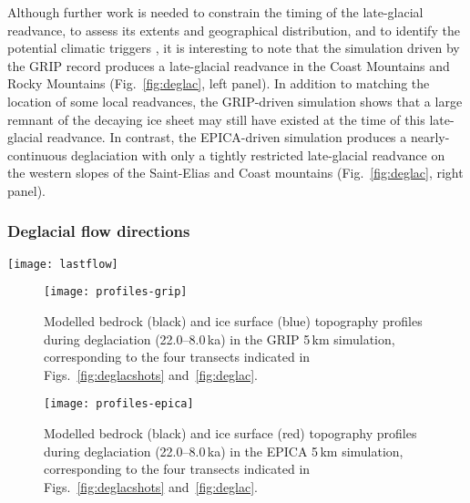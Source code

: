 \documentclass[tc]{copernicus}
\begin{document}
Although further work is needed to constrain the timing of the late-glacial
readvance, to assess its extents and geographical distribution, and to identify
the potential climatic triggers \citep{Menounos.etal.2008}, it is interesting
to note that the simulation driven by the GRIP record produces a late-glacial
readvance in the Coast Mountains and Rocky Mountains (Fig.~\ref{fig:deglac},
left panel). In addition to matching the location of some local readvances, the
GRIP-driven simulation shows that a large remnant of the decaying ice sheet
may still have existed at the time of this late-glacial readvance.
In contrast, the EPICA-driven simulation produces a nearly-continuous
deglaciation with only a tightly restricted late-glacial readvance on the
western slopes of the Saint-Elias and Coast mountains
(Fig.~\ref{fig:deglac}, right panel).


\subsubsection{Deglacial flow directions}

\begin{figure*}
  \texttt{[image: lastflow]}
  \caption{Modelled deglacial basal ice velocities. Hatches
           indicate areas that remain non-sliding throughout deglaciation
           (22.0--8.0\,ka), notably including parts of the Interior Plateau (IP).
           Note the concentric patterns of deglacial flow in the Liard
           Lowland (LL).
           Sliding grid cells were distinguished from non-sliding grid cells
           using a velocity threshold of 1\,\unit{m\,yr^{-1}}.
           Dashed segments indicate the location of profiles used in
           Figs.~\ref{fig:profiles-grip} and~\ref{fig:profiles-epica}.}
  \label{fig:lastflow}
\end{figure*}

\begin{figure}
  \texttt{[image: profiles-grip]}
  \caption{Modelled bedrock (black) and ice surface (blue) topography profiles
           during deglaciation (22.0--8.0\,ka) in the GRIP 5\,km
           simulation, corresponding to the four transects indicated in
           Figs.~\ref{fig:deglacshots} and~\ref{fig:deglac}.}
  \label{fig:profiles-grip}
\end{figure}

\begin{figure}
  \texttt{[image: profiles-epica]}
  \caption{Modelled bedrock (black) and ice surface (red) topography profiles
           during deglaciation (22.0--8.0\,ka) in the EPICA 5\,km
           simulation, corresponding to the four transects indicated in
           Figs.~\ref{fig:deglacshots} and~\ref{fig:deglac}.}
  \label{fig:profiles-epica}
\end{figure}
\end{document}
